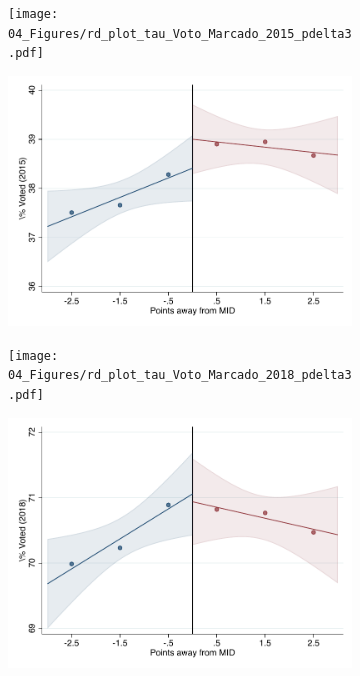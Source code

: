 \documentclass[oneside,11pt]{article}
\begin{document}
\begin{figure}[H]

    \ContinuedFloat
    \caption{(Cont.) RD plots for outcome variables across those assigned to either UNAM or IPN high-school, and those who are not\label{fig:ITT_rd_plot_elite_3}}
    \begin{center}
    
    \begin{subfigure}{0.475\textwidth}
        \centering
        \texttt{[image: 04\_Figures/rd\_plot\_tau\_Voto\_Marcado\_2015\_pdelta3.pdf]}
    \end{subfigure}
    \begin{subfigure}{0.475\textwidth}
        \centering
        \includegraphics[width=\textwidth]{04_Figures/rd_plot_mid_Voto_Marcado_2015_pdelta3.pdf}
    \end{subfigure}

    \begin{subfigure}{0.475\textwidth}
        \centering
        \texttt{[image: 04\_Figures/rd\_plot\_tau\_Voto\_Marcado\_2018\_pdelta3.pdf]}
    \end{subfigure}
    \begin{subfigure}{0.475\textwidth}
        \centering
        \includegraphics[width=\textwidth]{04_Figures/rd_plot_mid_Voto_Marcado_2018_pdelta3.pdf}
    \end{subfigure}


\end{center}
\end{figure}
\end{document}
